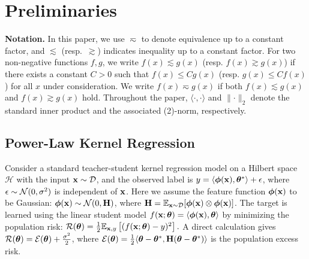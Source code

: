 \documentclass[11pt]{article}
\begin{document}
\section{Preliminaries}

{\bf Notation.} In this paper, we use $\eqsim$ to denote equivalence up to a constant factor, and $\lesssim$ (resp.~$\gtrsim$) indicates inequality up to a constant factor. For two non-negative functions $f,g$, we write $f(x)\lesssim g(x)$ (resp. $f(x)\gtrsim g(x)$) if there exists a constant $C>0$ such that $f(x)\leq C g(x)$ (resp. $g(x)\leq C f(x)$) for all $x$ under consideration. We write $f(x)\eqsim g(x)$ if both $f(x)\lesssim g(x)$ and $f(x)\gtrsim g(x)$ hold. 
Throughout the paper, \(\langle\cdot,\cdot\rangle\) and
\(\lVert\cdot\lVert_2\) denote the standard inner product and the associated (2)-norm, respectively.


\subsection{Power-Law Kernel Regression}
\label{sec:plkr}
Consider a standard teacher-student kernel regression model on a Hilbert space \(\mathcal H\) with the input \(\mathbf{x}\sim\mathcal{D}\), and the observed label is \(y=\langle\bm{\phi}(\mathbf{x}), \bm{\theta}^*\rangle + \epsilon\), where \(\epsilon \sim \mathcal{N}(0,\sigma^2)\) is independent of \(\mathbf{x}\). Here we assume the feature function $\bm{\phi}(\mathbf{x})$ to be Gaussian: $\bm{\phi}(\mathbf{x}) \sim \mathcal{N}(0,\mathbf{H})$, where $\mathbf{H} = \mathbb{E}_{\mathbf{x}\sim \mathcal{D}}[\bm{\phi}(\mathbf{x}) \otimes\bm{\phi}(\mathbf{x})]$.
The target is learned using the linear student model $f(\mathbf{x};\bm{\theta}) = \langle\bm{\phi}(\mathbf{x}), \bm{\theta}\rangle$ by minimizing the population risk:
$\mathcal{R}(\bm{\theta}) = \frac{1}{2} \mathbb{E}_{\mathbf{x},y}\left[(f(\mathbf{x};\bm{\theta})-y)^2\right].$
A direct calculation gives $\mathcal{R}(\bm{\theta}) = \mathcal{E}(\bm{\theta}) + \frac{\sigma^2}{2}$, where $\mathcal{E}(\bm{\theta}) = \frac{1}{2}\langle\bm{\theta}-\bm{\theta}^*,\mathbf{H} (\bm{\theta}-\bm{\theta}^*)\rangle$ is the population excess risk.
\end{document}
